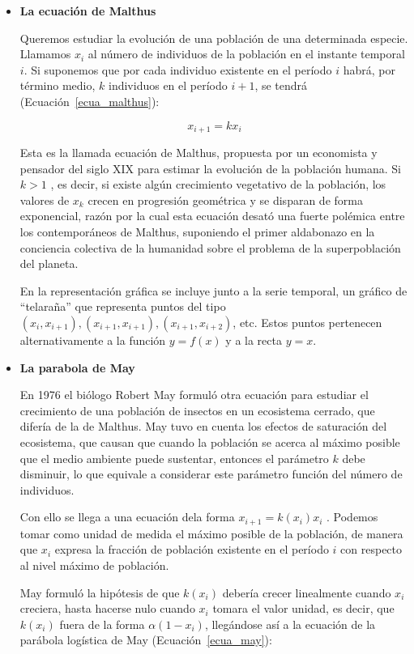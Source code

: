 \documentclass[letterpaper, 11pt, oneside]{article}
\theoremstyle{definition}
\theoremstyle{remark}
\begin{document}
\begin{itemize}
\item {\bf La ecuación de Malthus \par}
Queremos estudiar la evolución de una población de una determinada especie. Llamamos $x_i$ al número de individuos de la población en el instante temporal $i$. Si suponemos que por cada individuo existente en el período $i$ habrá, por término medio, $k$ individuos en el período $i+1$, se tendrá (Ecuación~\ref{ecua_malthus}):

\begin{equation}
	x_{i+1} = k x_i
	\label{ecua_malthus}
\end{equation}

Esta es la llamada ecuación de Malthus, propuesta por un economista y pensador del siglo XIX para estimar la evolución de la población humana. Si $k>1$ , es decir, si existe algún crecimiento vegetativo de la población, los valores de $x_k$ crecen en progresión geométrica y se disparan de forma exponencial, razón por la cual esta ecuación desató una fuerte polémica entre los contemporáneos de Malthus, suponiendo el primer aldabonazo en la conciencia colectiva de la humanidad sobre el problema de la superpoblación del planeta.

En la representación gráfica se incluye junto a la serie temporal, un gráfico de “telaraña” que representa puntos del tipo $(x_i , x_{i+1}), (x_{i+1},x_{i+1}), (x_{i+1},x_{i+2})$, etc. Estos puntos pertenecen alternativamente a la función $ y=f(x)$ y a la recta $y=x$.

\item {\bf La parabola de May\par}
En 1976 el biólogo Robert May formuló otra ecuación para estudiar el crecimiento de una población de insectos en un ecosistema cerrado, que difería de la de Malthus. May tuvo en cuenta los efectos de saturación del ecosistema, que causan que cuando la población se acerca al máximo posible que el medio ambiente puede sustentar, entonces el parámetro $k$ debe disminuir, lo que equivale a considerar este parámetro función del número de individuos.

Con ello se llega a una ecuación dela forma $x_{i+1} = k(x_i) x_i$ . Podemos tomar como unidad de medida el máximo posible de la población, de manera que $x_i$ expresa la fracción de población existente en el período $i$ con respecto al nivel máximo de población.

May formuló la hipótesis de que $k(x_i)$ debería crecer linealmente cuando $x_i$ creciera, hasta hacerse nulo cuando $x_i$ tomara el valor unidad, es decir, que $k(x_i)$ fuera de la forma $\alpha(1-x_i)$, llegándose así a la ecuación de la parábola logística de May (Ecuación~\ref{ecua_may}):


\end{itemize}
\end{document}
